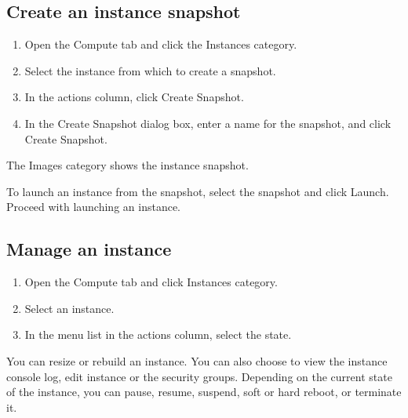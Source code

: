 \subsection*{Create an instance snapshot}\label{create-an-instance-snapshot}

\begin{enumerate}
\item Open the Compute tab and click the Instances
  category.
\item Select the instance from which to create a snapshot.
\item In the actions column, click Create Snapshot.
\item In the Create Snapshot dialog box, enter a name for the snapshot, and
  click Create Snapshot.
\end{enumerate}

The Images category shows the instance snapshot.

To launch an instance from the snapshot, select the snapshot and click
Launch. Proceed with launching an instance.

\subsection*{Manage an instance}\label{manage-an-instance}

\begin{enumerate}
\item Open the Compute tab and click Instances category.
\item Select an instance.
\item In the menu list in the actions column, select the state.
\end{enumerate}

You can resize or rebuild an instance. You can also choose to view the
instance console log, edit instance or the security groups. Depending on
the current state of the instance, you can pause, resume, suspend, soft
or hard reboot, or terminate it.

\label{server-power-down-states}


